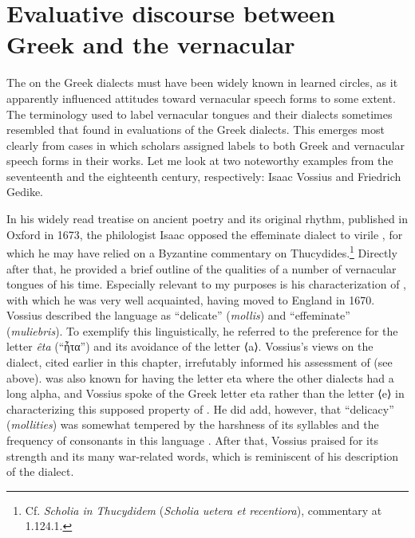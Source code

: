\section{Evaluative discourse between Greek and the vernacular}\label{sec:7.3}


The  on the Greek dialects must have been widely known in learned circles, as it apparently influenced attitudes toward vernacular speech forms to some extent. The terminology used to label vernacular tongues and their dialects sometimes resembled that found in evaluations of the Greek dialects. This emerges most clearly from cases in which scholars assigned labels to both Greek and vernacular speech forms in their works. Let me look at two noteworthy examples from the seventeenth and the eighteenth century, respectively: Isaac Vossius and Friedrich Gedike.

In his widely read treatise on ancient poetry and its original rhythm, published in Oxford in 1673, the  philologist Isaac \citet[54--55]{Vossius1673} opposed the effeminate  dialect to virile , for which he may have relied on a Byzantine commentary on Thucydides.\footnote{Cf. \textit{Scholia in Thucydidem} (\textit{Scholia uetera et recentiora}), commentary at 1.124.1.} Directly after that, he provided a brief outline of the qualities of a number of vernacular tongues of his time. Especially relevant to my purposes is his characterization of , with which he was very well acquainted, having moved to England in 1670. Vossius described the language as “delicate” (\textit{mollis}) and “effeminate” (\textit{muliebris}). To exemplify this linguistically, he referred to the  preference for the letter \textit{êta} (“ἦτα”) and its avoidance of the letter ⟨a⟩. Vossius’s views on the  dialect, cited earlier in this chapter, irrefutably informed his assessment of  (see  above).  was also known for having the letter eta where the other dialects had a long alpha, and Vossius spoke of the Greek letter eta rather than the  letter ⟨e⟩ in characterizing this supposed property of . He did add, however, that  “delicacy” (\textit{mollities}) was somewhat tempered by the harshness of its syllables and the frequency of consonants in this language \citep[56]{Vossius1673}. After that, Vossius praised  for its strength and its many war-related words, which is reminiscent of his description of the  dialect.

